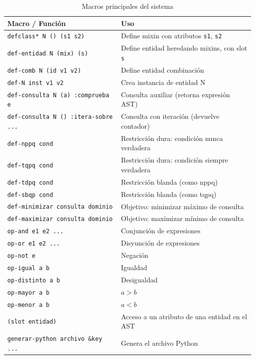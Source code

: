 \documentclass[12pt,a4paper]{article}
\newcommand{\code}[1]{\texttt{#1}}
\begin{document}
\begin{table}[ht]
\centering
\caption{Macros principales del sistema}
\begin{tabular}{@{}p{5cm}p{8cm}@{}}
\toprule
\textbf{Macro / Función} & \textbf{Uso} \\
\midrule
\code{defclass* N () (s1 s2)} & Define mixin con atributos \code{s1}, \code{s2} \\
\code{def-entidad N (mix) (s)} & Define entidad heredando mixins, con slot \code{s} \\
\code{def-comb N (id v1 v2)} & Define entidad combinación \\
\code{def-N inst v1 v2} & Crea instancia de entidad N \\
\code{def-consulta N (a) :comprueba e} & Consulta auxiliar (retorna expresión AST) \\
\code{def-consulta N () :itera-sobre ...} & Consulta con iteración (devuelve contador) \\
\code{def-nppq cond} & Restricción dura: condición nunca verdadera \\
\code{def-tqpq cond} & Restricción dura: condición siempre verdadera \\
\code{def-tdpq cond} & Restricción blanda (como nppq) \\
\code{def-sbqp cond} & Restricción blanda (como tqpq) \\
\code{def-minimizar consulta dominio} & Objetivo: minimizar máximo de consulta \\
\code{def-maximizar consulta dominio} & Objetivo: maximizar mínimo de consulta \\
\code{op-and e1 e2 ...} & Conjunción de expresiones \\
\code{op-or e1 e2 ...} & Disyunción de expresiones \\
\code{op-not e} & Negación \\
\code{op-igual a b} & Igualdad \\
\code{op-distinto a b} & Desigualdad \\
\code{op-mayor a b} & $a > b$ \\
\code{op-menor a b} & $a < b$ \\
\code{(slot entidad)} & Acceso a un atributo de una entidad en el AST \\
\code{generar-python archivo \&key ...} & Genera el archivo Python \\
\bottomrule
\end{tabular}
\end{table}

\end{document}
